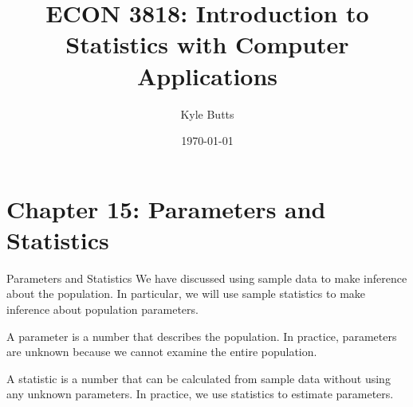 \documentclass{beamer}
\title{ECON 3818: Introduction to Statistics with Computer Applications}
\date{\today}
\author{Kyle Butts}
\begin{document}
\maketitle




\section{Chapter 15: Parameters and Statistics}

\begin{frame}{Parameters and Statistics}
	We have discussed using sample data to make inference about the population.  In particular, we will use sample \alert{statistics} to make inference about population \alert{parameters}.
	
    \begin{definition}[Parameter]
        \vspace{2.5mm}
		A \alert{parameter} is a number that describes the population. In practice, parameters are unknown because we cannot examine the entire population.
	\end{definition}
	
    \begin{definition}[Statistic]
        \vspace{2.5mm}
		A \alert{statistic} is a number that can be calculated from sample data without using any unknown parameters. In practice, we use statistics to estimate parameters.
	\end{definition}
\end{frame}
\end{document}
